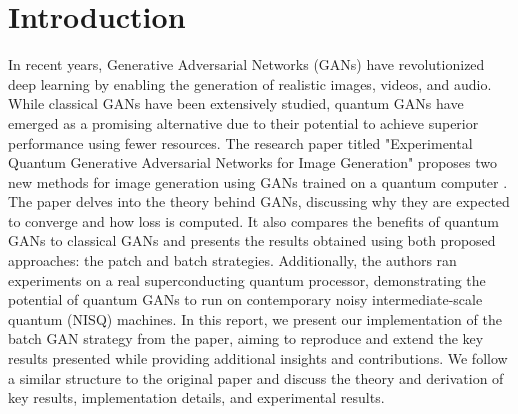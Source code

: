 \section{Introduction}
In recent years, Generative Adversarial Networks (GANs) have revolutionized deep learning by enabling the generation of realistic images, videos, and audio. While classical GANs have been extensively studied, quantum GANs have emerged as a promising alternative due to their potential to achieve superior performance using fewer resources. The research paper titled "Experimental Quantum Generative Adversarial Networks for Image Generation" proposes two new methods for image generation using GANs trained on a quantum computer \cite{huang2021}. The paper delves into the theory behind GANs, discussing why they are expected to converge and how loss is computed. It also compares the benefits of quantum GANs to classical GANs and presents the results obtained using both proposed approaches: the patch and batch strategies. Additionally, the authors ran experiments on a real superconducting quantum processor,
demonstrating the potential of quantum GANs to run on contemporary noisy intermediate-scale quantum (NISQ) machines. In this report, we present our implementation of the batch GAN strategy from the paper, aiming to reproduce and extend the key results presented while providing additional insights and contributions.
We follow a similar structure to the original paper and discuss the theory and derivation of key results, implementation details, and experimental results.
